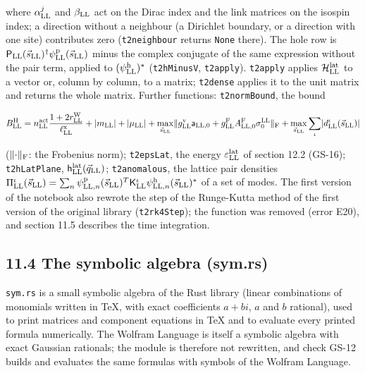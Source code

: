 \documentclass[
  10pt,
]{article}
\begin{document}
where \(\alpha^j_{\rm LL}\) and \(\beta_{\rm LL}\) act on the Dirac
index and the link matrices on the isospin index; a direction without a
neighbour (a Dirichlet boundary, or a direction with one site)
contributes zero (\texttt{t2neighbour} returns \texttt{None} there). The
hole row is
\(\mathsf P_{\rm LL}(\vec s_{\rm LL})^\dagger\psi^{\rm p}_{\rm LL}(\vec s_{\rm LL})\)
minus the complex conjugate of the same expression without the pair
term, applied to \((\psi^{\rm h}_{\rm LL})^*\) (\texttt{t2hMinusV},
\texttt{t2apply}). \texttt{t2apply} applies
\(\mathcal H^{\rm lat}_{\rm LL}\) to a vector or, column by column, to a
matrix; \texttt{t2dense} applies it to the unit matrix and returns the
whole matrix. Further functions: \texttt{t2normBound}, the bound

\[B^{\rm H}_{\rm LL}=n^{\rm act}_{\rm LL}\frac{1+2r^{\rm W}_{\rm LL}}{\ell^{\rm x}_{\rm LL}}+\lvert m_{\rm LL}\rvert+\lvert\mu_{\rm LL}\rvert+\max_{\vec s_{\rm LL}}\lVert g^{\rm v}_{\rm LL}\mathsf a_{{\rm LL},0}+g^{\rm F}_{\rm LL}A^{\rm F}_{{\rm LL},0}\sigma^{\rm LL}_0\rVert_{\rm F}+\max_{\vec s_{\rm LL}}\sum_\iota\lvert d^\iota_{\rm LL}(\vec s_{\rm LL})\rvert\]

(\(\lVert\cdot\rVert_{\rm F}\): the Frobenius norm); \texttt{t2epsLat},
the energy \(\varepsilon^{\rm lat}_{\rm LL}\) of section 12.2 (GS-16);
\texttt{t2hLatPlane}, \(\mathsf h^{\rm lat}_{\rm LL}(\vec q_{\rm LL})\);
\texttt{t2anomalous}, the lattice pair densities
\(\Pi^\iota_{\rm LL}(\vec s_{\rm LL})=\sum_n\psi^{\rm p}_{{\rm LL},n}(\vec s_{\rm LL})^T\mathsf K^\iota_{\rm LL}\psi^{\rm h}_{{\rm LL},n}(\vec s_{\rm LL})^*\)
of a set of modes. The first version of the notebook also rewrote the
step of the Runge-Kutta method of the first version of the original
library (\texttt{t2rk4Step}); the function was removed (error E20), and
section 11.5 describes the time integration.

\hypertarget{the-symbolic-algebra-sym.rs}{%
\subsection{11.4 The symbolic algebra
(sym.rs)}\label{the-symbolic-algebra-sym.rs}}

\texttt{sym.rs} is a small symbolic algebra of the Rust library (linear
combinations of monomials written in TeX, with exact coefficients
\(a+bi\), \(a\) and \(b\) rational), used to print matrices and
component equations in TeX and to evaluate every printed formula
numerically. The Wolfram Language is itself a symbolic algebra with
exact Gaussian rationals; the module is therefore not rewritten, and
check GS-12 builds and evaluates the same formulas with symbols of the
Wolfram Language.
\end{document}
